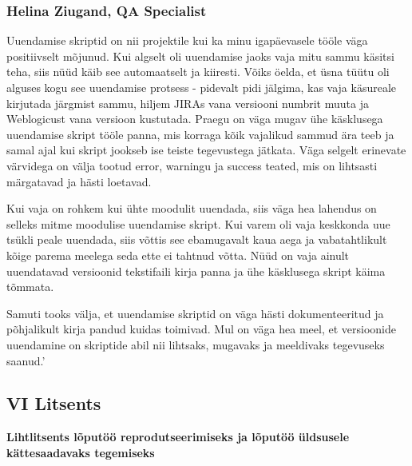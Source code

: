 \documentclass[12pt]{report}
\begin{document}
  \subsubsection{Helina Ziugand, QA Specialist}
  
  \begin{displayquote}
  Uuendamise skriptid on nii projektile kui ka minu igapäevasele tööle väga positiivselt mõjunud. 
Kui algselt oli uuendamise jaoks vaja mitu sammu käsitsi teha, siis nüüd käib see automaatselt ja kiiresti. Võiks öelda, et üsna tüütu oli alguses kogu see uuendamise protsess - pidevalt pidi jälgima, kas vaja käsureale kirjutada järgmist sammu, hiljem JIRAs vana versiooni numbrit muuta ja Weblogicust vana versioon kustutada. Praegu on väga mugav ühe käsklusega uuendamise skript tööle panna, mis korraga kõik vajalikud sammud ära teeb ja samal ajal kui skript jookseb ise teiste tegevustega jätkata. Väga selgelt erinevate värvidega on välja tootud error, warningu ja success teated, mis on lihtsasti märgatavad ja hästi loetavad.

Kui vaja on rohkem kui ühte moodulit uuendada, siis väga hea lahendus on selleks mitme moodulise uuendamise skript. Kui varem oli vaja keskkonda uue tsükli peale uuendada, siis võttis see ebamugavalt kaua aega ja vabatahtlikult kõige parema meelega seda ette ei tahtnud võtta. Nüüd on vaja ainult uuendatavad versioonid tekstifaili kirja panna ja ühe käsklusega skript käima tõmmata. 

Samuti tooks välja, et uuendamise skriptid on väga hästi dokumenteeritud ja põhjalikult kirja pandud kuidas toimivad. Mul on väga hea meel, et versioonide uuendamine on skriptide abil nii lihtsaks, mugavaks ja meeldivaks tegevuseks saanud.'
  \end{displayquote}

  \newpage

  \subsection*{VI Litsents}
  \label{licence}
  
  \textbf{Lihtlitsents lõputöö reprodutseerimiseks ja lõputöö üldsusele kättesaadavaks tegemiseks}\\
  
\end{document}
